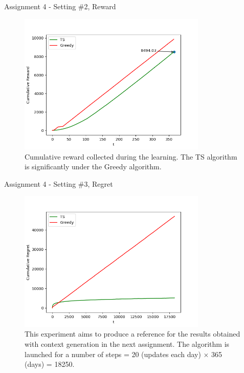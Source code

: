 \documentclass[11pt]{beamer}
\begin{document}
\begin{frame}{Assignment 4 - Setting \#2, Reward}
\begin{figure}[hbtp]
\centering
\includegraphics[width=0.8\textwidth]{images/assignment_4_exp_2_cum_reward.png}
\caption{Cumulative reward collected during the learning. The TS algorithm is significantly under the Greedy algorithm.}
\end{figure}
\end{frame}

\begin{frame}{Assignment 4 - Setting \#3, Regret}
\begin{figure}[hbtp]
\centering
\includegraphics[width=0.8\textwidth]{images/assignment_4_exp_3_cum_regret.png}
\caption{This experiment aims to produce a reference for the results obtained with context generation in the next assignment. The algorithm is launched for a number of steps = 20 (updates each day) $\times$ 365 (days) = 18250.}
\end{figure}
\end{frame}
\end{document}
